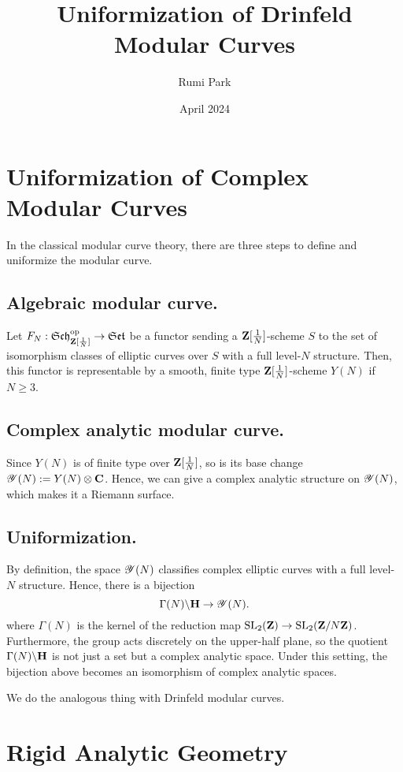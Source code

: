 \documentclass{amsart}
\title{Uniformization of Drinfeld Modular Curves}
\author{Rumi Park}
\date{April 2024}
\begin{document}
\maketitle

\section{Uniformization of Complex Modular Curves}

In the classical modular curve theory, there are three steps to define and uniformize the modular curve.

\subsection{Algebraic modular curve.} Let $F_N: \mathfrak{Sch}_{\mathbf{Z}[\frac{1}{N}]}^{\operatorname{op}} \to \mathfrak{Set}$ be a functor sending a $\mathbf{Z}[\frac{1}{N}]$-scheme $S$ to the set of isomorphism classes of elliptic curves over $S$ with a full level-$N$ structure. Then, this functor is representable by a smooth, finite type $\mathbf{Z}[\frac{1}{N}]$-scheme $Y(N)$ if $N \ge 3$.

\subsection{Complex analytic modular curve.} Since $Y(N)$ is of finite type over $\mathbf{Z}[\frac{1}{N}]$, so is its base change $\mathscr{Y}(N) := Y(N) \otimes \mathbf{C}$. Hence, we can give a complex analytic structure on $\mathscr{Y}(N)$, which makes it a Riemann surface.

\subsection{Uniformization.} By definition, the space $\mathscr{Y}(N)$ classifies complex elliptic curves with a full level-$N$ structure. Hence, there is a bijection
$$ \Gamma(N) \backslash \mathbf{H} \to \mathscr{Y}(N). $$
where $\Gamma(N)$ is the kernel of the reduction map $\operatorname{SL}_2(\mathbf{Z}) \to \operatorname{SL}_2(\mathbf{Z}/N\mathbf{Z})$. Furthermore, the group acts discretely on the upper-half plane, so the quotient $\Gamma(N) \backslash \mathbf{H}$ is not just a set but a complex analytic space. Under this setting, the bijection above becomes an isomorphism of complex analytic spaces.

We do the analogous thing with Drinfeld modular curves.

\section{Rigid Analytic Geometry}
\end{document}
